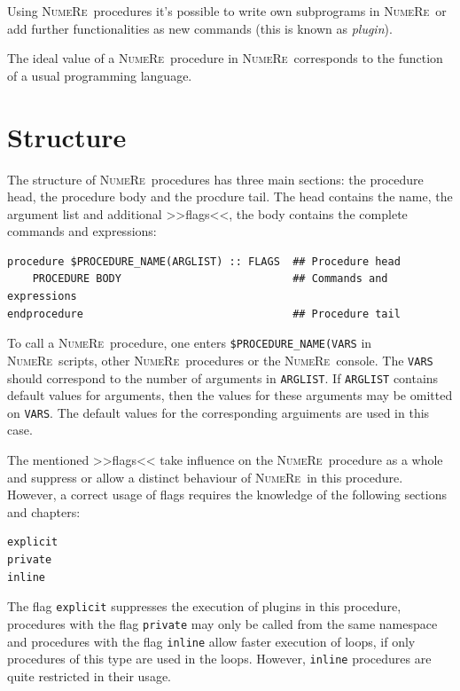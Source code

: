 \documentclass[DIV=14,headsepline,footsepline]{scrbook}
\newcommand{\NR}{\textsc{Nu\-me\-Re}}
\begin{document}
				Using \NR\ procedures it's possible to write own subprograms in \NR\ or add further functionalities as new commands (this is known as \emph{plugin}).
				
				The ideal value of a \NR\ procedure in \NR\ corresponds to the function of a usual programming language.
								
			\section{Structure}
				The structure of \NR\ procedures has three main sections: the procedure head, the procedure body and the procdure tail. The head contains the name, the argument list and additional >>flags<<, the body contains the complete commands and expressions:
				\begin{lstlisting}
procedure $PROCEDURE_NAME(ARGLIST) :: FLAGS  ## Procedure head
	PROCEDURE BODY                           ## Commands and expressions
endprocedure                                 ## Procedure tail
				\end{lstlisting}
				To call a \NR\ procedure, one enters \lstinline+$PROCEDURE_NAME(VARS+ in \NR\ scripts, other \NR\ procedures or the \NR\ console. The \lstinline+VARS+ should correspond to the number of arguments in \lstinline+ARGLIST+. If \lstinline+ARGLIST+ contains default values for arguments, then the values for these arguments may be omitted on \lstinline+VARS+. The default values for the corresponding arguiments are used in this case.
				
				The mentioned >>flags<< take influence on the \NR\ procedure as a whole and suppress or allow a distinct behaviour of \NR\ in this procedure. However, a correct usage of flags requires the knowledge of the following sections and chapters:
				\begin{lstlisting}
explicit
private
inline
				\end{lstlisting}
				The flag \lstinline+explicit+ suppresses the execution of plugins in this procedure, procedures with the flag \lstinline+private+ may only be called from the same namespace and procedures with the flag \lstinline+inline+ allow faster execution of loops, if only procedures of this type are used in the loops. However, \lstinline+inline+ procedures are quite restricted in their usage.
				
\end{document}
